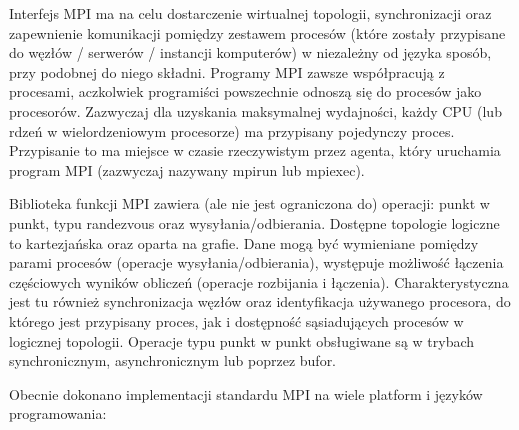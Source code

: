 \documentclass[10pt,a4paper,titlepage,twoside]{report}
\begin{document}
Interfejs MPI ma na celu dostarczenie wirtualnej topologii, synchronizacji oraz zapewnienie komunikacji pomiędzy zestawem procesów (które zostały przypisane do węzłów / serwerów / instancji komputerów) w niezależny od języka sposób, przy podobnej do niego składni. Programy MPI zawsze współpracują z procesami, aczkolwiek programiści powszechnie odnoszą się do procesów jako procesorów. Zazwyczaj dla uzyskania maksymalnej wydajności, każdy CPU (lub rdzeń w wielordzeniowym procesorze) ma przypisany pojedynczy proces. Przypisanie to ma miejsce w czasie rzeczywistym przez agenta, który uruchamia program MPI (zazwyczaj nazywany mpirun lub mpiexec).

Biblioteka funkcji MPI zawiera (ale nie jest ograniczona do) operacji: punkt w punkt, typu randezvous oraz wysyłania/odbierania. Dostępne topologie logiczne to kartezjańska oraz oparta na grafie. Dane mogą być wymieniane pomiędzy parami procesów (operacje wysyłania/odbierania), występuje możliwość łączenia częściowych wyników obliczeń (operacje rozbijania i łączenia). Charakterystyczna jest tu również synchronizacja węzłów oraz identyfikacja używanego procesora, do którego jest przypisany proces, jak i dostępność sąsiadujących procesów w logicznej topologii. Operacje typu punkt w punkt obsługiwane są w trybach synchronicznym, asynchronicznym lub poprzez bufor.

Obecnie dokonano implementacji standardu MPI na wiele platform i języków programowania:
\end{document}
